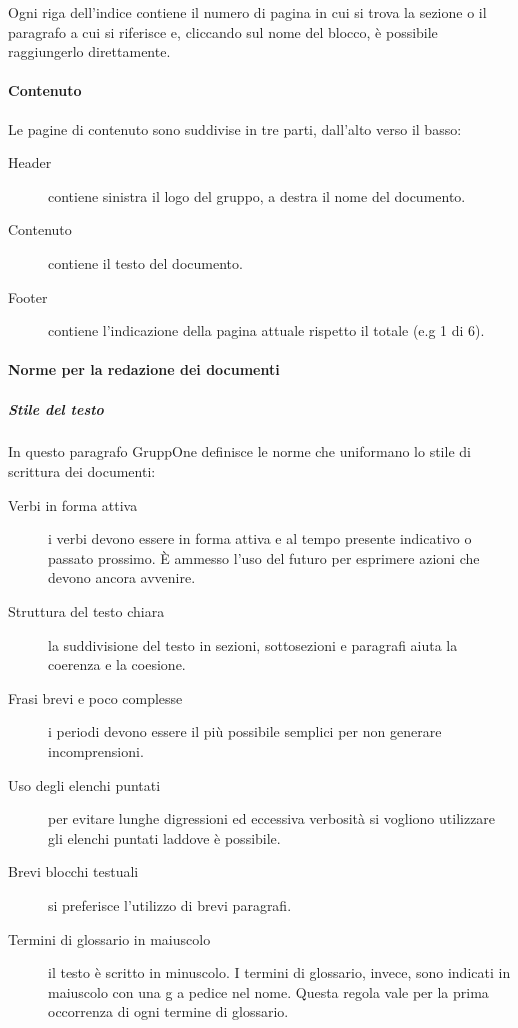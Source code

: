 \documentclass[../norme-di-progetto.tex]{subfiles}
\begin{document}
Ogni riga dell'indice contiene il numero di pagina in cui si trova la sezione o il paragrafo a cui si riferisce e, cliccando sul nome del blocco, è possibile raggiungerlo direttamente.

\paragraph{Contenuto}%
\label{par:contenuto}
Le pagine di contenuto sono suddivise in tre parti, dall'alto verso il basso:
\begin{description}
  \item [Header] contiene sinistra il logo del gruppo, a destra il nome del documento.
  \item [Contenuto] contiene il testo del documento.
  \item [Footer] contiene l'indicazione della pagina attuale rispetto il totale (e.g 1 di 6).
\end{description}

\paragraph{Norme per la redazione dei documenti}%
\label{par:norme_per_la_redazione_dei_documenti}

\subparagraph{Stile del testo}%
\label{subp:stile_del_testo}
In questo paragrafo GruppOne definisce le norme che uniformano lo stile di scrittura dei documenti:
\begin{description}
  \item [Verbi in forma attiva] i verbi devono essere in forma attiva e al tempo presente indicativo o passato prossimo. È ammesso l'uso del futuro per esprimere azioni che devono ancora avvenire.
  \item [Struttura del testo chiara] la suddivisione del testo in sezioni, sottosezioni e paragrafi aiuta la coerenza e la coesione.
  \item [Frasi brevi e poco complesse] i periodi devono essere il più possibile semplici per non generare incomprensioni.
  \item [Uso degli elenchi puntati] per evitare lunghe digressioni ed eccessiva verbosità si vogliono utilizzare gli elenchi puntati laddove è possibile.
  \item [Brevi blocchi testuali] si preferisce l'utilizzo di brevi paragrafi.
  \item [Termini di glossario in maiuscolo] il testo è scritto in minuscolo. I termini di glossario, invece, sono indicati in maiuscolo con una g a pedice nel nome. Questa regola vale per la prima occorrenza di ogni termine di glossario.
\end{description}
\end{document}
